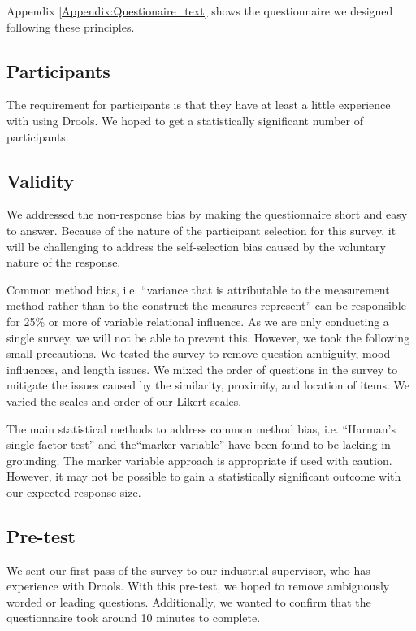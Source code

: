 Appendix \ref{Appendix:Questionaire_text} shows the questionnaire we designed following these principles.


\subsection{Participants}

The requirement for participants is that they have at least a little experience with using Drools.
We hoped to get a statistically significant number of participants.

\subsection{Validity}
We addressed the non-response bias\cite{armstrong1977estimating} by making the questionnaire short and easy to answer.
Because of the nature of the participant selection for this survey, it will be challenging to address the self-selection bias caused by the voluntary nature of the response.

Common method bias, i.e. ``variance that is attributable to the measurement method rather than to the construct the measures represent''\cite{podsakoff2003common} can be responsible for 25\% or more of variable relational influence.
As we are only conducting a single survey, we will not be able to prevent this. 
However, we took the following small precautions.
We tested the survey to remove question ambiguity, mood influences, and length issues.
We mixed the order of questions in the survey to mitigate the issues caused by the similarity, proximity, and location of items.
We varied the scales and order of our Likert scales.

The main statistical methods to address common method bias, i.e. ``Harman's single factor test''\cite{podsakoff2003common} and the``marker variable''\cite{lindell2001accounting} have been found to be lacking in grounding\cite{gorrell2011countering}.
The marker variable approach is appropriate if used with caution.
However, it may not be possible to gain a statistically significant outcome with our expected response size.

\subsection{Pre-test}
We sent our first pass of the survey to our industrial supervisor, who has experience with Drools.
With this pre-test, we hoped to remove ambiguously worded or leading questions.
Additionally, we wanted to confirm that the questionnaire took around 10 minutes to complete.

